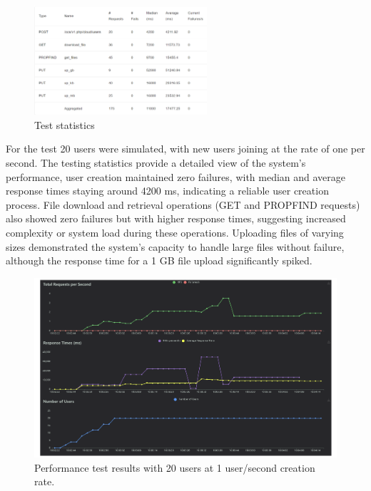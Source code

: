 \documentclass[12pt]{article}
\begin{document}
\begin{figure}
  \centering
  \includegraphics[width=0.57\textwidth]{Test_stat.png}
  \caption{Test statistics}
  \label{fig:yourlabel}
\end{figure}



For the test 20 users were simulated, with new users joining at the rate of one per second. The testing statistics provide a detailed view of the system's performance, user creation maintained zero failures, with median and average response times staying around 4200 ms, indicating a reliable user creation process. File download and retrieval operations (GET and PROPFIND requests) also showed zero failures but with higher response times, suggesting increased complexity or system load during these operations. Uploading files of varying sizes demonstrated the system's capacity to handle large files without failure, although the response time for a 1 GB file upload significantly spiked. 

\begin{figure}[ht]
\centering
\includegraphics[width=\linewidth]{Test_20_1s.png}
\caption{Performance test results with 20 users at 1 user/second creation rate.}
\label{fig:testresults}
\end{figure}
\end{document}
